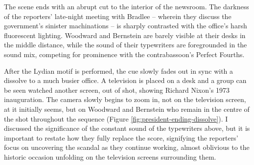 The scene ends with an abrupt cut to the interior of the newsroom.
The darkness of the reporters' late-night meeting with Bradlee – wherein they discuss the government's sinister machinations – is sharply contrasted with the office's harsh fluorescent lighting.
Woodward and Bernstein are barely visible at their desks in the middle distance, while the sound of their typewriters are foregrounded in the sound mix, competing for prominence with the contrabassoon's Perfect Fourths.

After the Lydian motif is performed, the cue slowly fades out in sync with a dissolve to a much busier office.
A television is placed on a desk and a group can be seen watched another screen, out of shot, showing Richard Nixon's 1973 inauguration.
The camera slowly begins to zoom in, not on the television screen, at it initially seems, but on Woodward and Bernstein who remain in the centre of the shot throughout the sequence (Figure \ref{fig:president-ending-dissolve}).
I discussed the significance of the constant sound of the typewriters above, but it is important to restate how they fully replace the score, signifying the reporters' focus on uncovering the scandal as they continue working, almost oblivious to the historic occasion unfolding on the television screens surrounding them. 

